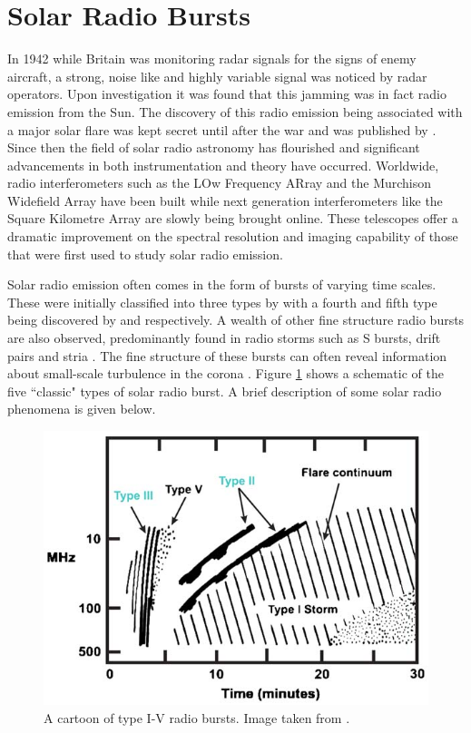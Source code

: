 \section{Solar Radio Bursts}
In 1942 while Britain was monitoring radar signals for the signs of enemy aircraft, a strong, noise like and highly variable signal was noticed by radar operators. Upon investigation it was found that this jamming was in fact radio emission from the Sun. The discovery of this radio emission being associated with a major solar flare was kept secret until after the war and was published by \cite{Appleton1946}.
Since then the field of solar radio astronomy has flourished and significant advancements in both instrumentation and theory have occurred. Worldwide, radio interferometers such as the LOw Frequency ARray \cite[LOFAR;][]{VanHaarlem2013} and the Murchison Widefield Array \citep[MWA;][]{Lonsdale2009} have been built while next generation interferometers like the Square Kilometre Array \citep[SKA;][]{McMullin2020} are slowly being brought online. These telescopes offer a dramatic improvement on the spectral resolution and imaging capability of those that were first used to study solar radio emission.

Solar radio emission often comes in the form of bursts of varying time scales. These were initially classified into three types by \cite{Wild1950b} with a fourth and fifth type being discovered by \cite{Boischot1957} and \cite{Wild1959} respectively. A wealth of other fine structure radio bursts are also observed, predominantly found in radio storms such as S bursts, drift pairs and stria \citep{McConnell1980,Melrose1982,NelsonandMelrose1985}. 
The fine structure of these bursts can often reveal information about small-scale turbulence in the corona \citep{Reid2021}.
Figure \ref{fig:burst_cartoon} shows a schematic of the five ``classic" types of solar radio burst. A brief description of some solar radio phenomena is given below.
\begin{figure}[ht]
    \centering
    \includegraphics[width=0.75\columnwidth]{Images/Burst_cartoon.jpg}
    \caption[Cartoon of type I-V radio bursts.]{A cartoon of type I-V radio bursts. Image taken from \cite{Cliver2009}.}
    \label{fig:burst_cartoon}
\end{figure}
